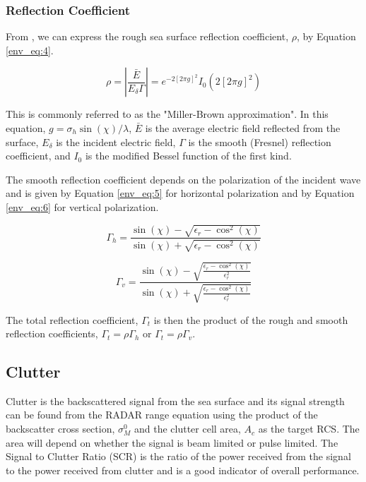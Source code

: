 \subsubsection{Reflection Coefficient}
From \cite{miller_reflection}, we can express the rough sea surface reflection coefficient, $\rho$, by Equation \ref{env_eq:4}. 

  \begin{equation}
  \label{env_eq:4}
\rho = \left|\frac{\bar{E}}{E_\delta \Gamma} \right| = e^{-2\left[2\pi g \right]^2}I_0\left( 2\left[2\pi g \right]^2\right) 
\end{equation}
\renewcommand{\baselinestretch}{2} \small\normalsize

This is commonly referred to as the "Miller-Brown approximation". In this equation, $g = \sigma_h\sin(\chi)/\lambda$, $\bar{E}$ is the average electric field reflected from the surface, $E_\delta$ is the incident electric field, $\Gamma$ is the smooth (Fresnel) reflection coefficient, and $I_0$ is the modified Bessel function of the first kind.

The smooth reflection coefficient depends on the polarization of the incident wave and is given by Equation \ref{env_eq:5} for horizontal polarization and by Equation \ref{env_eq:6} for vertical polarization.

  \begin{equation}
  \label{env_eq:5}
 \Gamma_h = \frac{\sin(\chi)- \sqrt{\epsilon_r - \cos^2(\chi)}}{\sin(\chi) + \sqrt{\epsilon_r - \cos^2(\chi)}}
  \end{equation}
  \renewcommand{\baselinestretch}{2} \small\normalsize
  
  \begin{equation}
  \label{env_eq:6}
 \Gamma_v = \frac{\sin(\chi)- \sqrt{\frac{\epsilon_r - \cos^2(\chi)}{\epsilon_r^2}}}{\sin(\chi) + \sqrt{\frac{\epsilon_r - \cos^2(\chi)}{\epsilon_r^2}}}
  \end{equation}
  \renewcommand{\baselinestretch}{2} \small\normalsize
  
The total reflection coefficient, $\Gamma_t$ is then the product of the rough and smooth reflection coefficients, $\Gamma_t = \rho\Gamma_h$ or $\Gamma_t = \rho\Gamma_v$.

\subsection{Clutter}
Clutter is the backscattered signal from the sea surface and its signal strength can be found from the RADAR range equation using the product of the backscatter cross section, $\sigma_M^0$ and the clutter cell area, $A_c$ as the target RCS. The area will depend on whether the signal is beam limited or pulse limited. The Signal to Clutter Ratio (SCR) is the ratio of the power received from the signal to the power received from clutter and is a good indicator of overall performance.

